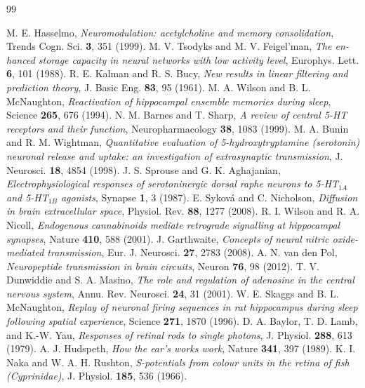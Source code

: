 \begin{thebibliography}{99}
\begin{otherlanguage}{english}
 M. E. Hasselmo, \emph{Neuromodulation: acetylcholine and memory consolidation}, Trends Cogn. Sci. \textbf{3}, 351 (1999).
 M. V. Tsodyks and M. V. Feigel'man, \emph{The enhanced storage capacity in neural networks with low activity level}, Europhys. Lett. \textbf{6}, 101 (1988).
 R. E. Kalman and R. S. Bucy, \emph{New results in linear filtering and prediction theory}, J. Basic Eng. \textbf{83}, 95 (1961).
 M. A. Wilson and B. L. McNaughton, \emph{Reactivation of hippocampal ensemble memories during sleep}, Science \textbf{265}, 676 (1994).
 N. M. Barnes and T. Sharp, \emph{A review of central 5-HT receptors and their function}, Neuropharmacology \textbf{38}, 1083 (1999).
 M. A. Bunin and R. M. Wightman, \emph{Quantitative evaluation of 5-hydroxytryptamine (serotonin) neuronal release and uptake: an investigation of extrasynaptic transmission}, J. Neurosci. \textbf{18}, 4854 (1998).
 J. S. Sprouse and G. K. Aghajanian, \emph{Electrophysiological responses of serotoninergic dorsal raphe neurons to 5-HT$_{1A}$ and 5-HT$_{1B}$ agonists}, Synapse \textbf{1}, 3 (1987).
 E. Syková and C. Nicholson, \emph{Diffusion in brain extracellular space}, Physiol. Rev. \textbf{88}, 1277 (2008).
 R. I. Wilson and R. A. Nicoll, \emph{Endogenous cannabinoids mediate retrograde signalling at hippocampal synapses}, Nature \textbf{410}, 588 (2001).
 J. Garthwaite, \emph{Concepts of neural nitric oxide-mediated transmission}, Eur. J. Neurosci. \textbf{27}, 2783 (2008).
 A. N. van den Pol, \emph{Neuropeptide transmission in brain circuits}, Neuron \textbf{76}, 98 (2012).
 T. V. Dunwiddie and S. A. Masino, \emph{The role and regulation of adenosine in the central nervous system}, Annu. Rev. Neurosci. \textbf{24}, 31 (2001).
 W. E. Skaggs and B. L. McNaughton, \emph{Replay of neuronal firing sequences in rat hippocampus during sleep following spatial experience}, Science \textbf{271}, 1870 (1996).
 D. A. Baylor, T. D. Lamb, and K.-W. Yau, \emph{Responses of retinal rods to single photons}, J. Physiol. \textbf{288}, 613 (1979).
 A. J. Hudspeth, \emph{How the ear's works work}, Nature \textbf{341}, 397 (1989).
 K. I. Naka and W. A. H. Rushton, \emph{S-potentials from colour units in the retina of fish (Cyprinidae)}, J. Physiol. \textbf{185}, 536 (1966).

\end{otherlanguage}
\end{thebibliography}
